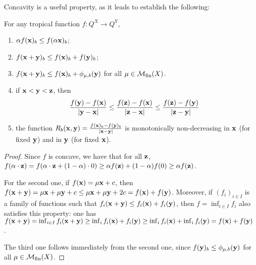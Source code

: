 Concavity is a useful property, as it leads to establish the following:
\begin{proposition}
For any tropical function $f: Q^{X}\to Q^{Y}$, 
\begin{enumerate}
\item $ \alpha f(\mathbf{x})_{b}\leq  f(\alpha\mathbf{x})_{b}$;
\item $f(\mathbf{x}+\mathbf{y})_{b}\leq f(\mathbf{x})_{b}+f(\mathbf{y})_{b}$;
\item $f(\mathbf{x}+\mathbf{y})_{b} \leq f(\mathbf{x})_{b} + \phi_{\mu,b}(\mathbf{y})$ 
for all $\mu\in \mathcal{M}_{\mathrm{fin}}(X)$.

\item if $\mathbf{x} < \mathbf{y} < \mathbf{z}$, then 
$$
\frac{f(\mathbf{y})-f(\mathbf{x})}{|\mathbf{y}-\mathbf{x}|} \leq \frac{f(\mathbf{z})-f(\mathbf{x})}{|\mathbf{z}-\mathbf{x}|}
\leq \frac{f(\mathbf{z})-f(\mathbf{y})}{|\mathbf{z}-\mathbf{y}|}
$$

\item the function $R_{b}(\mathbf{x}, \mathbf{y})= \frac{f(\mathbf{x})_{b}-f(\mathbf{y})_{b}}{| \mathbf{x}- \mathbf{y}|}$ is monotonically non-decreasing in $\mathbf{x}$ (for fixed $\mathbf{y}$) and in $\mathbf{y}$ (for fixed $\mathbf{x}$).

\end{enumerate}
\end{proposition}
\begin{proof}
Since $f$ is concave, we have that for all $\mathbf{z}$, 
$f(\alpha\cdot\mathbf{z})=f(\alpha\cdot\mathbf{z}+(1-\alpha)\cdot 0)\geq 
\alpha f(\mathbf{z})+(1-\alpha)f(0)\geq \alpha f(\mathbf{z})$. 

For the second one, 
if $f(\mathbf{x})=\mu \mathbf{x}+c$, then $f(\mathbf{x}+\mathbf{y})= \mu \mathbf{x}+ \mu \mathbf{y} + c  \leq
\mu \mathbf{x} + \mu \mathbf{y} + 2c = f(\mathbf{x})+f(\mathbf{y})$.
Moreover, if $(f_{i})_{i\in I}$ is a family of functions such that $f_{i}(\mathbf{x}+\mathbf{y})\leq f_{i}(\mathbf{x})+f_{i}(\mathbf{y})$, then 
$f=\inf _{i\in I}f_{i}$ also satisfies this property: 
one has $f(\mathbf{x}+\mathbf{y})=\inf_{i\in I}f_{i}(\mathbf{x}+\mathbf{y}) \geq \inf_{i} f_{i}(\mathbf{x})+f_{i}(\mathbf{y}) \geq \inf_{i}f_{i}(\mathbf{x}) + \inf_{i}f_{i}(\mathbf{y})=f(\mathbf{x})+f(\mathbf{y})$.
%

The third one follows immediately from the second one, since $f(\mathbf{y})_{b}\leq \phi_{\mu,b}(\mathbf{y})$ for all $\mu\in \mathcal{M}_{\mathrm{fin}}(X)$.













\end{proof}


